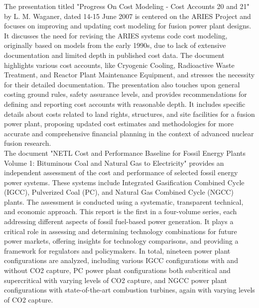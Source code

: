 The presentation titled "Progress On Cost Modeling - Cost Accounts 20 and 21" by L. M. Waganer, dated 14-15 June 2007 \cite{Waganer2007} is centered on the ARIES Project and focuses on improving and updating cost modeling for fusion power plant designs. It discusses the need for revising the ARIES systems code cost modeling, originally based on models from the early 1990s, due to lack of extensive documentation and limited depth in published cost data. The document highlights various cost accounts, like Cryogenic Cooling, Radioactive Waste Treatment, and Reactor Plant Maintenance Equipment, and stresses the necessity for their detailed documentation. The presentation also touches upon general costing ground rules, safety assurance levels, and provides recommendations for defining and reporting cost accounts with reasonable depth. It includes specific details about costs related to land rights, structures, and site facilities for a fusion power plant, proposing updated cost estimates and methodologies for more accurate and comprehensive financial planning in the context of advanced nuclear fusion research.\\

The document "NETL Cost and Performance Baseline for Fossil Energy Plants Volume 1: Bituminous Coal and Natural Gas to Electricity" \cite{JamesCorrespondingAuthor2019} provides an independent assessment of the cost and performance of selected fossil energy power systems. These systems include Integrated Gasification Combined Cycle (IGCC), Pulverized Coal (PC), and Natural Gas Combined Cycle (NGCC) plants. The assessment is conducted using a systematic, transparent technical, and economic approach. This report is the first in a four-volume series, each addressing different aspects of fossil fuel-based power generation. It plays a critical role in assessing and determining technology combinations for future power markets, offering insights for technology comparisons, and providing a framework for regulators and policymakers. In total, nineteen power plant configurations are analyzed, including various IGCC configurations with and without CO2 capture, PC power plant configurations both subcritical and supercritical with varying levels of CO2 capture, and NGCC power plant configurations with state-of-the-art combustion turbines, again with varying levels of CO2 capture.